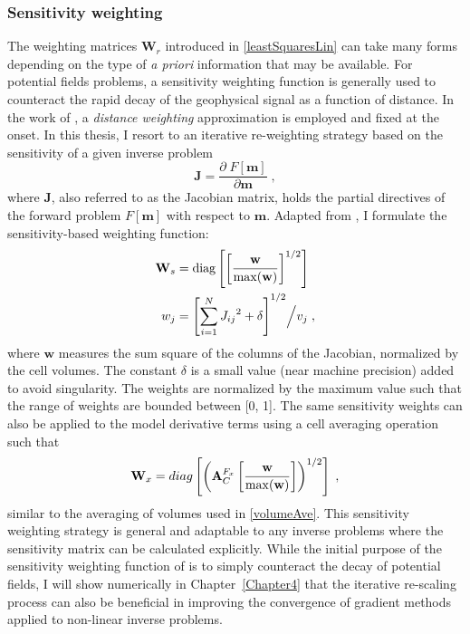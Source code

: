 \subsubsection{Sensitivity weighting}
The weighting matrices $\mathbf{W}_r$ introduced in \eqref{leastSquaresLin} can take many forms depending on the type of \emph{a priori} information that may be available. For potential fields problems, a sensitivity weighting function is generally used to counteract the rapid decay of the geophysical signal as a function of distance. In the work of \cite{LiOldenburg1996}, a \emph{distance weighting} approximation is employed and fixed at the onset.
In this thesis, I resort to an iterative re-weighting strategy based on the sensitivity of a given inverse problem
\begin{equation}\label{Jk}
\mathbf{J} = \frac{\partial \; F[\mathbf{m}]}{\partial \boldsymbol{\mathbf{m}}}\;,
\end{equation}
where $\mathbf{J}$, also referred to as the Jacobian matrix, holds the partial directives of the forward problem $F[\mathbf{m}]$ with respect to $\mathbf{m}$.
Adapted from \cite{Haber1997}, I formulate the sensitivity-based weighting function:
\begin{equation}\label{iter_sens_weight}
\begin{split}
\mathbf{W}_s &= \rm{diag} \left[ {\left[\frac{\mathbf{ w}}{\rm{max}(\mathbf{ w})}\right]}^{1/2}\right]\\
w_{j} &= {\left[\sum_{i=1}^{N}{J_{ij}}^2 + \delta \right]}^{1/2} \Big/ v_j\;,
\end{split}
\end{equation}
where $\mathbf{w}$ measures the sum square of the columns of the Jacobian, normalized by the cell volumes. The constant $\delta$ is a small value (near machine precision) added to avoid singularity. The weights are normalized by the maximum value such that the range of weights are bounded between [0, 1]. 
The same sensitivity weights can also be applied to the model derivative terms using a cell averaging operation such that
\begin{equation}\label{sensWAve}
\mathbf{W}_x = diag\left[\left( \mathbf{A}_C^{F_x} \left[\frac{\mathbf{ w}}{\rm{max}(\mathbf{ w})}\right]\right)^{1/2}  \right]\;,
\end{equation}
similar to the averaging of volumes used in \eqref{volumeAve}. 
This sensitivity weighting strategy is general and adaptable to any inverse problems where the sensitivity matrix can be calculated explicitly.
While the initial purpose of the sensitivity weighting function of \cite{LiOldenburg1996} is to simply counteract the decay of potential fields, I will show numerically in Chapter~\ref{Chapter4} that the iterative re-scaling process can also be beneficial in improving the convergence of gradient methods applied to non-linear inverse problems.


